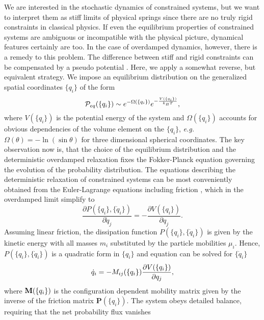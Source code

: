 We are interested in the stochastic dynamics of constrained systems, but we want to interpret them as
stiff limits of physical springs since there are no truly rigid constraints in classical physics. If even the 
equilibrium properties of constrained systems are ambiguous or incompatible with the physical picture,
dynamical features certainly are too.
In the case of overdamped dynamics, however, there is a remedy to this problem. The 
difference between stiff and rigid constraints can 
be compensated by a pseudo potential \cite{Helfand_JChemPhys_79, Fixman_JChemPhys_78a, Roitman_JChemPhys_84}.
Here, we apply a somewhat reverse, but equivalent strategy. We 
impose an equilibrium distribution on the generalized spatial coordinates $\{q_{i}\}$ of the form 
\begin{equation}
\label{eq:Peq}
{\cal P}_{eq}(\{q_i\}) \sim e^{-\Omega(\{q_i\})} e^{-\frac{V(\{q_i\})}{k_BT}},
\end{equation}
where $V(\{q_i\})$ is the potential energy of the system and $\Omega(\{q_i\})$ accounts for
obvious dependencies of the volume element on the $\{q_i\}$, \emph{e.g.}~$\Omega(\theta)=-\ln(\sin \theta)$ for
three dimensional spherical coordinates. The key observation now is, that the choice of the equilibrium
 distribution and the deterministic overdamped relaxation fixes the 
Fokker-Planck equation governing the evolution of the probability distribution. 
The equations describing the deterministic relaxation of constrained
systems can be most conveniently obtained from the Euler-Lagrange equations including 
friction \cite{Goldstein}, which in the overdamped limit  simplify to 
\begin{equation}
\label{eq:lagrange}
\frac{\partial P(\{q_i\}, \{\dot{q}_i\})}{\partial \dot{q}_j}=-\frac{\partial V(\{q_i\})}{\partial q_j}.
\end{equation}
Assuming linear friction, the dissipation function $P(\{q_i\}, \{\dot{q}_i\})$ is given by the kinetic energy with all masses 
$m_{i}$ substituted by the particle mobilities $\mu_{i}$. 
Hence, $P(\{q_i\}, \{\dot{q}_i\})$ is a quadratic form in $\{q_i\}$ and equation  
can be solved for $\{\dot{q}_i\}$
\begin{equation}
\label{eq:det_eq}
\dot{q}_i=-M_{ij}(\{q_i\})\frac{\partial V(\{q_i\})}{\partial q_j},
\end{equation}
where $\mathbf{M}(\{q_i\})$ is the configuration dependent mobility matrix given by the inverse of the friction
matrix $\mathbf{P}(\{q_i\})$. The system obeys detailed balance, requiring that the net probability flux vanishes 
